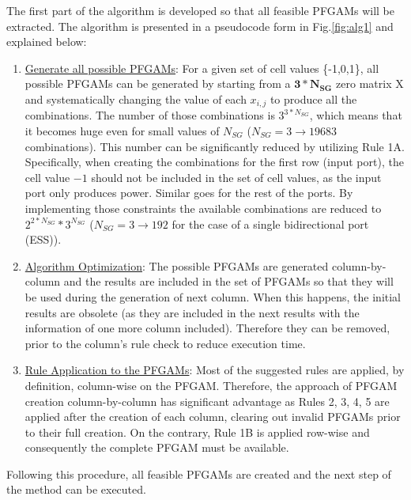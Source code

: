 \documentclass[conference]{IEEEtran}
\begin{document}
The first part of the algorithm is developed so that all feasible PFGAMs will be extracted. The algorithm is presented in a pseudocode form in Fig.\ref{fig:alg1} and explained below:
\begin{enumerate}
    \item \underline{Generate all possible PFGAMs}: For a given set of cell values \{-1,0,1\}, all possible PFGAMs can be generated by starting from a \( \mathbf{3 * N_{SG}} \) zero matrix X and systematically changing the value of each $x_{i,j}$ to produce all the combinations. The number of those combinations is $3^{3*N_{SG}}$, which means that it becomes huge even for small values of $N_{SG}$ ($N_{SG}=3\longrightarrow 19683$ combinations). This number can be significantly reduced by utilizing Rule 1A. Specifically, when creating the combinations for the first row (input port), the cell value $-1$ should not be included in the set of cell values, as the input port only produces power. Similar goes for the rest of the ports. By implementing those constraints the available combinations are reduced to $2^{2*N_{SG}}*3^{N_{SG}}$ ($N_{SG}=3\longrightarrow 192$ for the case of a single bidirectional port (ESS)).
    \item \underline{Algorithm Optimization}: The possible PFGAMs are generated column-by-column and the results are included in the set of PFGAMs so that they will be used during the generation of next column. When this happens, the initial results are obsolete (as they are included in the next results with the information of one more column included). Therefore they can be removed, prior to the column's rule check to reduce execution time.
    \item \underline{Rule Application to the PFGAMs}: Most of the suggested rules are applied, by definition, column-wise on the PFGAM. Therefore, the approach of PFGAM creation column-by-column has significant advantage as Rules 2, 3, 4, 5 are applied after the creation of each column, clearing out invalid PFGAMs prior to their full creation. On the contrary, Rule 1B is applied row-wise and consequently the complete PFGAM must be available.
\end{enumerate}
Following this procedure, all feasible PFGAMs are created and the next step of the method can be executed.\\
\end{document}
